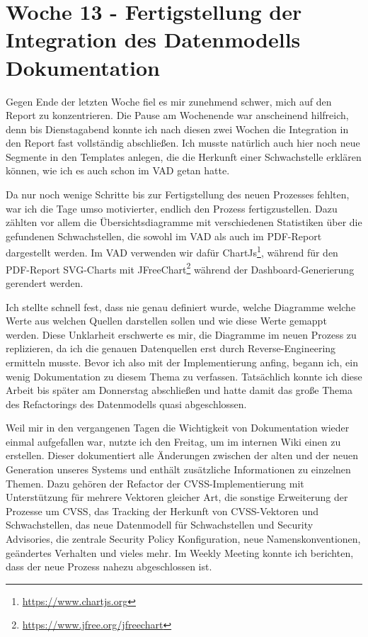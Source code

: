 \section{Woche 13 - Fertigstellung der Integration des Datenmodells \headerand Dokumentation} \label{sec:bericht-wo-13-initial}


\lweekdaymarginpar{\weekdayMondayShort, \weekdayTuesdayShort}

Gegen Ende der letzten Woche fiel es mir zunehmend schwer, mich auf den Report zu konzentrieren.
Die Pause am Wochenende war anscheinend hilfreich, denn bis Dienstagabend konnte ich nach diesen zwei Wochen die Integration in den Report fast vollständig abschließen.
Ich musste natürlich auch hier noch neue Segmente in den Templates anlegen, die die Herkunft einer Schwachstelle erklären können, wie ich es auch schon im VAD getan hatte.

\sweekdaymarginpar{\weekdayWednesdayShort, \weekdayThursdayShort}

Da nur noch wenige Schritte bis zur Fertigstellung des neuen Prozesses fehlten, war ich die Tage umso motivierter, endlich den Prozess fertigzustellen.
Dazu zählten vor allem die Übersichtsdiagramme mit verschiedenen Statistiken über die gefundenen Schwachstellen, die sowohl im VAD als auch im PDF-Report dargestellt werden.
Im VAD verwenden wir dafür ChartJs\footnote{\url{https://www.chartjs.org}}, während für den PDF-Report SVG-Charts mit JFreeChart\footnote{\url{https://www.jfree.org/jfreechart}} während der Dashboard-Generierung gerendert werden.

Ich stellte schnell fest, dass nie genau definiert wurde, welche Diagramme welche Werte aus welchen Quellen darstellen sollen und wie diese Werte gemappt werden.
Diese Unklarheit erschwerte es mir, die Diagramme im neuen Prozess zu replizieren, da ich die genauen Datenquellen erst durch Reverse-Engineering ermitteln musste.
Bevor ich also mit der Implementierung anfing, begann ich, ein wenig Dokumentation zu diesem Thema zu verfassen.
Tatsächlich konnte ich diese Arbeit bis später am Donnerstag abschließen und hatte damit das große Thema des Refactorings des Datenmodells quasi abgeschlossen.

\sweekdaymarginpar{\weekdayFridayLong}

Weil mir in den vergangenen Tagen die Wichtigkeit von Dokumentation wieder einmal aufgefallen war, nutzte ich den Freitag, um im internen Wiki einen  zu erstellen.
Dieser dokumentiert alle Änderungen zwischen der alten und der neuen Generation unseres Systems und enthält zusätzliche Informationen zu einzelnen Themen.
Dazu gehören der Refactor der CVSS-Implementierung mit Unterstützung für mehrere Vektoren gleicher Art, die sonstige Erweiterung der Prozesse um CVSS, das Tracking der Herkunft von CVSS-Vektoren und Schwachstellen, das neue Datenmodell für Schwachstellen und Security Advisories, die zentrale Security Policy Konfiguration, neue Namenskonventionen, geändertes Verhalten und vieles mehr.
Im Weekly Meeting konnte ich berichten, dass der neue Prozess nahezu abgeschlossen ist.
